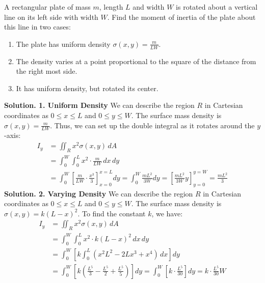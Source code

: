 \documentclass[11pt]{report}
\begin{document}
\begin{example}
    A rectangular plate of mass $m$, length $L$ and width $W$ is rotated about a vertical line on its left side with width $W$. Find the moment of inertia of the plate about this line in two cases:
    \begin{enumerate}
        \item The plate has uniform density $\sigma(x,y) = \frac{m}{LW}$.
        \item The density varies at a point proportional to the square of the distance from the right most side.
        \item It has uniform density, but rotated its center.
    \end{enumerate}

   \textbf{Solution. 1. Uniform Density} We can describe the region $R$ in Cartesian coordinates as $0 \le x \le L$ and $0 \le y \le W$. The surface mass density is $\sigma(x,y) = \frac{m}{LW}$. Thus, we can set up the double integral as it rotates around the $y$-axis:
    \begin{align*}
        I_y &= \iint_R x^2 \sigma(x,y) \, dA \\
        &= \int_0^W \int_0^L x^2 \cdot \frac{m}{LW} \, dx \, dy \\
        &= \int_0^W \left[ \frac{m}{LW} \cdot \frac{x^3}{3} \right]_{x=0}^{x=L} dy = \int_0^W \frac{mL^2}{3W} dy = \left[ \frac{mL^2}{3W} y \right]_{y=0}^{y=W} = \frac{mL^2}{3}
    \end{align*}
    \textbf{Solution. 2. Varying Density} We can describe the region $R$ in Cartesian coordinates as $0 \le x \le L$ and $0 \le y \le W$. The surface mass density is $\sigma(x,y) = k(L - x)^2$. To find the constant $k$, we have:
    \begin{align*}
        I_y &= \iint_R x^2 \sigma(x,y) \, dA  \\
        &= \int_0^W \int_0^L x^2 \cdot k(L - x)^2 \, dx \, dy \\
        &= \int_0^W \left[ k \int_0^L (x^2L^2 - 2Lx^3 + x^4) \, dx \right] dy \\
        &= \int_0^W \left[ k \left( \frac{L^5}{3} - \frac{L^5}{2} + \frac{L^5}{5} \right) \right] dy = \int_0^W \left[ k \cdot \frac{L^5}{30} \right] dy = k \cdot \frac{L^5}{30} W
    \end{align*}


\end{example}
\end{document}
